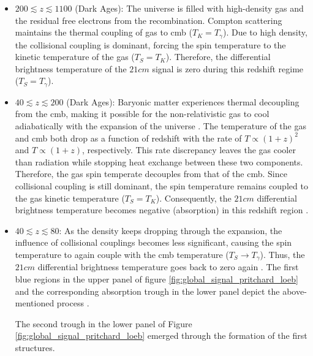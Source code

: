 \documentclass[12pt, TexShade, letterpaper]{report}
\begin{document}
\begin{itemize}
\item $200 \lesssim z \lesssim 1100$ (Dark Ages): The universe is filled with high-density gas and the residual free electrons from the recombination. Compton scattering maintains the thermal coupling of gas to \gls{cmb} ($T_K = T_\gamma$). Due to high density, the collisional coupling is dominant, forcing the spin temperature to the kinetic temperature of the gas ($T_S = T_K$). 
Therefore, the differential brightness temperature of the $21cm$ signal is zero during this redshift regime ($T_S = T_\gamma$)\cite{21century}.\par

\item $40 \lesssim z \lesssim 200$ (Dark Ages): Baryonic matter experiences thermal decoupling from the \gls{cmb}, making it possible for the non-relativistic gas to cool adiabatically with the expansion of the universe \cite{21century}. The temperature of the gas and \gls{cmb} both drop as a function of redshift with the rate of $T\propto (1+z)^{2}$ and $T\propto (1+z)$, respectively. This rate discrepancy leaves the gas cooler than radiation while stopping heat exchange between these two components. Therefore, the gas spin temperate decouples from that of the \gls{cmb}. Since collisional coupling is still dominant, the spin temperature remains coupled to the gas kinetic temperature ($T_S = T_K$). Consequently, the $21cm$ differential brightness temperature becomes negative (absorption) in this redshift region \cite{map_universe, 21century}.\par

\item $40 \lesssim z \lesssim 80$: As the density keeps dropping through the expansion, the influence of collisional couplings becomes less significant, causing the spin temperature to again couple with the \gls{cmb} temperature ($T_S \rightarrow T_\gamma$). Thus, the $21cm$ differential brightness temperature goes back to zero again \cite{map_universe}. The first blue regions in the upper panel of figure \ref{fig:global_signal_pritchard_loeb} and the corresponding absorption trough in the lower panel depict the above-mentioned process \cite{map_universe, 21century}.\par

The second trough in the lower panel of Figure \ref{fig:global_signal_pritchard_loeb} emerged through the formation of the first structures.


\end{itemize}
\end{document}
